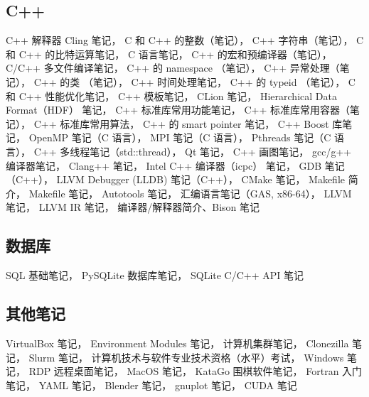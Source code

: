 \subsection{C++}
C++ 解释器 Cling 笔记，
C 和 C++ 的整数（笔记），
C++ 字符串（笔记），
C 和 C++ 的比特运算笔记，
C 语言笔记，
C++ 的宏和预编译器（笔记），
C/C++ 多文件编译笔记，
C++ 的 namespace （笔记），
C++ 异常处理（笔记），
C++ 的类 （笔记），
C++ 时间处理笔记，
C++ 的 typeid （笔记），
C 和 C++ 性能优化笔记，
C++ 模板笔记，
CLion 笔记，
Hierarchical Data Format（HDF） 笔记，
C++ 标准库常用功能笔记，
C++ 标准库常用容器（笔记），
C++ 标准库常用算法，
C++ 的 smart pointer 笔记，
C++ Boost 库笔记，
OpenMP 笔记（C 语言），
MPI 笔记（C 语言），
Pthreads 笔记（C 语言），
C++ 多线程笔记（std::thread），
Qt 笔记，
C++ 画图笔记，
gcc/g++ 编译器笔记，
Clang++ 笔记，
Intel C++ 编译器（icpc） 笔记，
GDB 笔记（C++），
LLVM Debugger (LLDB) 笔记（C++），
CMake 笔记，
Makefile 简介，
Makefile 笔记，
Autotools 笔记，
汇编语言笔记（GAS, x86-64），
LLVM 笔记，
LLVM IR 笔记，
编译器/解释器简介、Bison 笔记

\subsection{数据库}
SQL 基础笔记，
PySQLite 数据库笔记，
SQLite C/C++ API 笔记

\subsection{其他笔记}
VirtualBox 笔记，
Environment Modules 笔记，
计算机集群笔记，
Clonezilla 笔记，
Slurm 笔记，
计算机技术与软件专业技术资格（水平）考试，
Windows 笔记，
RDP 远程桌面笔记，
MacOS 笔记，
KataGo 围棋软件笔记，
Fortran 入门笔记，
YAML 笔记，
Blender 笔记，
gnuplot 笔记，
CUDA 笔记

